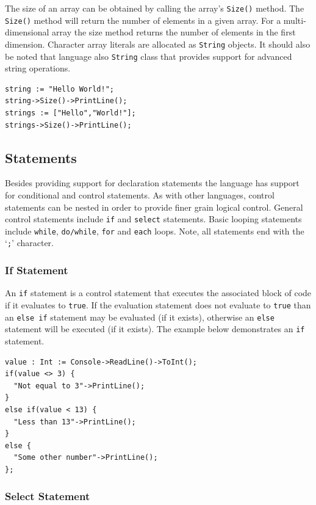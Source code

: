\documentclass[12pt]{article}
\begin{document}
The size of an array can be obtained by calling the array's \texttt{Size()} method.  The \texttt{Size()} method will return the number of elements in a given array.  For a multi-dimensional array the size method returns the number of elements in the first dimension.  Character array literals are allocated as \texttt{String} objects.  It should also be noted that language also \texttt{String} class that provides support for advanced string operations.

\begin{verbatim}
string := "Hello World!";
string->Size()->PrintLine();
strings := ["Hello","World!"];
strings->Size()->PrintLine();
\end{verbatim}

\subsection{Statements}
Besides providing support for declaration statements the language has
support for conditional and control statements.  As with other
languages, control statements can be nested in order to provide finer
grain logical control. General control statements include \texttt{if}
and \texttt{select} statements. Basic looping statements include
\texttt{while}, \texttt{do/while}, \texttt{for} and \texttt{each}
loops.  Note, all statements end with the `\texttt{;}' character.

\subsubsection{If Statement}

An \texttt{if} statement is a control statement that executes the associated block of code if it evaluates to \texttt{true}.  If the evaluation statement does not evaluate to \texttt{true} than an \texttt{else if} statement may be evaluated (if it exists), otherwise an \texttt{else} statement will be executed (if it exists).  The example below demonstrates an \texttt{if} statement.

\begin{verbatim}
value : Int := Console->ReadLine()->ToInt();
if(value <> 3) {
  "Not equal to 3"->PrintLine();
}
else if(value < 13) {
  "Less than 13"->PrintLine();
}
else {
  "Some other number"->PrintLine();
};
\end{verbatim}

\subsubsection{Select Statement}
\end{document}
